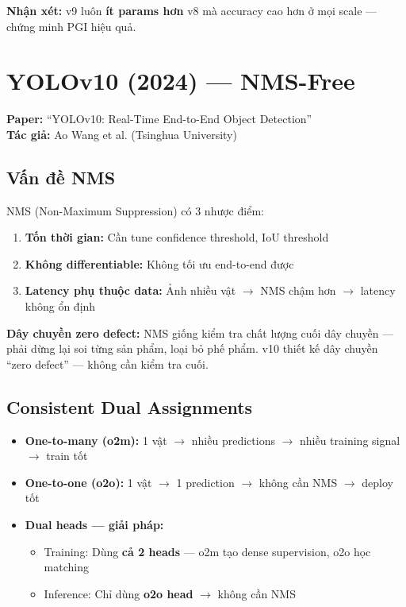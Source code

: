 \textbf{Nhận xét:} v9 luôn \textbf{ít params hơn} v8 mà accuracy cao hơn ở mọi scale --- chứng minh PGI hiệu quả.

\section{YOLOv10 (2024) --- NMS-Free}
\textbf{Paper:} ``YOLOv10: Real-Time End-to-End Object Detection''\\
\textbf{Tác giả:} Ao Wang et al. (Tsinghua University)

\subsection{Vấn đề NMS}
NMS (Non-Maximum Suppression) có 3 nhược điểm:
\begin{enumerate}
    \item \textbf{Tốn thời gian:} Cần tune confidence threshold, IoU threshold
    \item \textbf{Không differentiable:} Không tối ưu end-to-end được
    \item \textbf{Latency phụ thuộc data:} Ảnh nhiều vật $\rightarrow$ NMS chậm hơn $\rightarrow$ latency không ổn định
\end{enumerate}

\begin{analogybox}
\textbf{Dây chuyền zero defect:} NMS giống kiểm tra chất lượng cuối dây chuyền --- phải dừng lại soi từng sản phẩm, loại bỏ phế phẩm. v10 thiết kế dây chuyền ``zero defect'' --- không cần kiểm tra cuối.
\end{analogybox}

\subsection{Consistent Dual Assignments}
\begin{itemize}
    \item \textbf{One-to-many (o2m):} 1 vật $\rightarrow$ nhiều predictions $\rightarrow$ nhiều training signal $\rightarrow$ train tốt
    \item \textbf{One-to-one (o2o):} 1 vật $\rightarrow$ 1 prediction $\rightarrow$ không cần NMS $\rightarrow$ deploy tốt
    \item \textbf{Dual heads --- giải pháp:}
    \begin{itemize}
        \item Training: Dùng \textbf{cả 2 heads} --- o2m tạo dense supervision, o2o học matching
        \item Inference: Chỉ dùng \textbf{o2o head} $\rightarrow$ không cần NMS
    \end{itemize}
\end{itemize}

